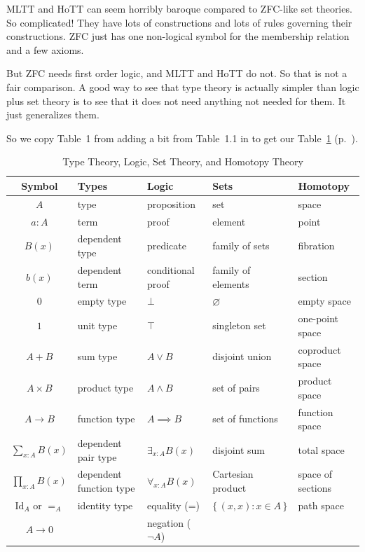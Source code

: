 \documentclass[11pt]{article}
\newcommand{\set}[1]{\{\,#1\,\}}
\begin{document}
MLTT and HoTT can seem horribly baroque compared to ZFC-like set theories.
So complicated!  They have lots of constructions and lots of rules
governing their constructions.  ZFC just has one non-logical symbol for the
membership relation and a few axioms.

But ZFC needs first order logic, and MLTT and HoTT do not.  So that is not
a fair comparison.  A good way to see that type theory is actually simpler
than logic plus set theory is to see that it does not need anything
not needed for them.  It just generalizes them.

So we copy Table~1 from  adding a bit from
Table~1.1 in \citet{rijke} to get our Table~\ref{tab:foo}
(p.~\pageref{tab:foo}).
\begin{table}
\begin{center}
\begin{tabular}{cllll}
Symbol & Types & Logic & Sets & Homotopy \\
\hline
$A$ & type & proposition & set & space \\
$a : A$ & term & proof & element & point \\
$B(x)$ & dependent type & predicate & family of sets & fibration \\
$b(x)$ & dependent term & conditional proof & family of elements & section \\
$0$ & empty type & $\bot$ & $\varnothing$ & empty space \\
$1$ & unit type & $\top$ & singleton set & one-point space \\
$A + B$ & sum type & $A \vee B$ & disjoint union & coproduct space \\
$A \times B$ & product type & $A \wedge B$ & set of pairs & product space \\
$A \to B$ & function type & $A \implies B$ & set of functions & function space
\\
$\sum_{x : A} B(x)$ & dependent pair type & $\exists_{x : A} B(x)$ &
    disjoint sum & total space \\
$\prod_{x : A} B(x)$ & dependent function type & $\forall_{x : A} B(x)$ &
    Cartesian product & space of sections \\
$\text{Id}_A$ or $=_A$ & identity type & equality (=) &
    $\set{(x, x) : x \in A}$ & path space \\
$A \to 0$ & & negation ($\neg A$) & &
\end{tabular}
\end{center}
\caption{Type Theory, Logic, Set Theory, and Homotopy Theory}
\label{tab:foo}
\end{table}
\end{document}
